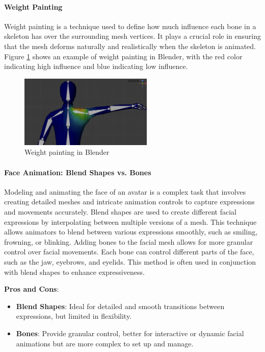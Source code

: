 \documentclass[../../main.tex]{subfiles}
\begin{document}
\paragraph{Weight Painting}
\label{par:weight_painting}

Weight painting is a technique used to define how much influence each bone in a skeleton has over the surrounding mesh vertices. It plays a crucial role in ensuring that the mesh deforms naturally and realistically when the skeleton is animated. Figure \ref{fig:weight_painting} shows an example of weight painting in Blender, with the red color indicating high influence and blue indicating low influence.

\begin{figure} 
  \centering \includegraphics[width = 2.5in]{chapters/background_work/images/weight_painting.png} 
  \caption{Weight painting in Blender} 
  \label{fig:weight_painting} 
\end{figure}

\paragraph{Face Animation: Blend Shapes vs. Bones}
\label{par:face_animation_blend_shapes_vs_bones}

Modeling and animating the face of an avatar is a complex task that involves creating detailed meshes and intricate animation controls to capture expressions and movements accurately. Blend shapes are used to create different facial expressions by interpolating between multiple versions of a mesh. This technique allows animators to blend between various expressions smoothly, such as smiling, frowning, or blinking. Adding bones to the facial mesh allows for more granular control over facial movements. Each bone can control different parts of the face, such as the jaw, eyebrows, and eyelids. This method is often used in conjunction with blend shapes to enhance expressiveness.

\textbf{Pros and Cons}:

\begin{itemize}
  \item \textbf{Blend Shapes}: Ideal for detailed and smooth transitions between expressions, but limited in flexibility.
  \item \textbf{Bones}: Provide granular control, better for interactive or dynamic facial animations but are more complex to set up and manage.
\end{itemize}
\end{document}
